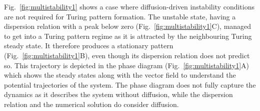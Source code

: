 Fig.~\ref{fig:multistability1} shows a case where diffusion-driven instability conditions are not required for Turing pattern formation.
The unstable state, having a dispersion relation with a peak below zero (Fig.~\ref{fig:multistability1}C), managed to get into a Turing pattern regime as it is attracted by the neighbouring Turing steady state.
It therefore produces a stationary pattern (Fig.~\ref{fig:multistability1}B), even though its dispersion relation does not predict so.
This trajectory is depicted in the phase diagram (Fig.~\ref{fig:multistability1}A) which shows the steady states along with the vector field to understand the potential trajectories of the system.
The phase diagram does not fully capture the dynamics as it describes the system without diffusion, while the dispersion relation and the numerical solution do consider diffusion.

